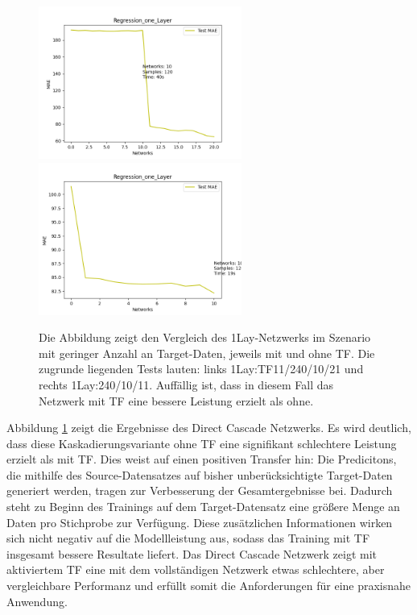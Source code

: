 \begin{figure}[htpb]
    \includegraphics[height=5cm]{../../Plots/ba_plots/regression_small/onelayer_ts.png}
    \includegraphics[height=5cm]{../../Plots/ba_plots/regression_small/woonelayer_ts.png}
    \caption{\label{fig:smallonl} 
    \small{Die Abbildung zeigt den Vergleich des 1Lay-Netzwerks im Szenario mit geringer Anzahl an Target-Daten, jeweils mit und ohne TF. Die 
    zugrunde liegenden Tests lauten: links 1Lay:TF11/240/10/21 und rechts 1Lay:240/10/11. Auffällig ist, dass in diesem Fall das Netzwerk mit 
    TF eine bessere Leistung erzielt als ohne.}}
\end{figure}

Abbildung \ref{fig:smallonl} zeigt die Ergebnisse des Direct Cascade Netzwerks. Es wird deutlich, dass diese Kaskadierungsvariante ohne TF eine 
signifikant schlechtere Leistung erzielt als mit TF. Dies weist auf einen positiven Transfer hin: Die Predicitons, die mithilfe des 
Source-Datensatzes auf bisher unberücksichtigte Target-Daten generiert werden, tragen zur Verbesserung der Gesamtergebnisse bei. Dadurch steht zu 
Beginn des Trainings auf dem Target-Datensatz eine größere Menge an Daten pro Stichprobe zur Verfügung. Diese zusätzlichen Informationen wirken 
sich nicht negativ auf die Modellleistung aus, sodass das Training mit TF insgesamt bessere Resultate liefert. 
Das Direct Cascade Netzwerk zeigt mit aktiviertem TF eine mit dem vollständigen Netzwerk etwas schlechtere, aber vergleichbare Performanz und 
erfüllt somit die Anforderungen für eine praxisnahe Anwendung.

